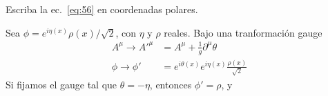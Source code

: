 \begin{example} %
Escriba la ec.~\eqref{eq:56} en coordenadas polares.

Sea $\phi=e^{i\eta(x)}\rho(x)/\sqrt{2}$, con $\eta$ y $\rho$ reales. Bajo una tranformaci\'on gauge
\begin{align}
A^\mu\to {A'}^\mu&=A^\mu+\frac{1}{g}\partial^\mu\theta\nonumber\\
  \label{eq:86}
  \phi\to\phi'&=e^{i\theta(x)}e^{i\eta(x)}\frac{\rho(x)}{\sqrt{2}}
\end{align}
Si fijamos el gauge tal que $\theta=-\eta$, entonces $\phi'=\rho$, y

\end{example}
